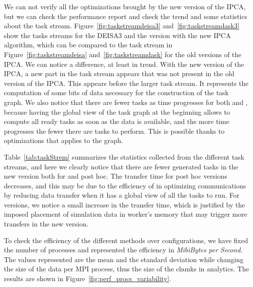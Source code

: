 We can not verify all the optimizations brought by the new version of the IPCA, but we can check the performance report and check the trend and some statistics about the task stream. 
Figure~\ref{fig:taskstreamdeisa3} and~\ref{fig:taskstreamdask3} show the tasks streams for the DEISA3 and the \dask version with the new IPCA algorithm, which can be compared to the task stream in Figure~\ref{fig:taskstreamdeisa} and~\ref{fig:taskstreamdask} for the old versions of the IPCA. 
We can notice a difference, at least in trend.  
With the new version of the IPCA, a new part in the task stream appears that was not present in the old version of the IPCA. This appears before the larger task stream. 
It represents the computation of some bits of data necessary for the construction of the task graph. We also notice that there are fewer tasks as time progresses for both \deisa and \dask, because having the global view of the task graph at the beginning allows \dask to compute all ready tasks as soon as the data is available, and the more time progresses the fewer there are tasks to perform.
This is possible thanks to  optimizations that \dask applies to the graph. 

Table~\ref{tab:taskStrem} summarizes the statistics collected from the different task streams, and here we clearly notice that there are fewer generated tasks in the new version both for \deisa and post hoc. 
The transfer time for post hoc versions decreases, and this may be due to the efficiency of \dask in optimizing communications by reducing data transfer when it has a global view of all the tasks to run. For \deisa versions, we notice a small increase in the transfer time, which is justified by the imposed placement of simulation data in worker's memory that may trigger more transfers in the new version. 



To check the efficiency of the different methods over configurations, we have fixed the number of processes and represented the efficiency in \textit{MibiBytes per Second}.
The values represented are the mean and the standard deviation while changing the size of the data per MPI process, thus the size of the chunks in \dask analytics. The results are shown in Figure~\ref{fig:perf_procs_variability}. 

